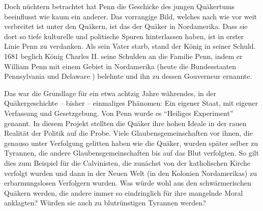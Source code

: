 \medskip

Doch nüchtern betrachtet hat Penn die Geschicke des jungen Quäkertums
beeinflusst wie kaum ein anderer. Das vorrangige Bild, welches nach wie vor weit
verbreitet ist unter den Quäkern, ist das der Quäker in Nordamerika. Dass sie
dort so tiefe kulturelle und politische Spuren hinterlassen haben, ist in erster
Linie Penn zu verdanken. Als sein Vater starb, stand der König in seiner Schuld.
1681 beglich König Charles II.  seine
Schulden  an die Familie Penn, indem er William Penn mit einem
Gebiet in Nordamerika (heute die Bundesstaaten Pennsylvania
 und Delaware ) belehnte und ihn
zu dessen Gouverneur ernannte.

\medskip

Das war die Grundlage für ein etwa achtzig Jahre währendes, in der Quäkergeschichte
-- bisher -- einmaliges Phänomen: Ein eigener Staat, mit eigener Verfassung und
Gesetzgebung. Von Penn wurde es "`Heiliges Experiment"' genannt. In diesem Projekt
stellten die Quäker ihre hohen Ideale in der rauen Realität der Politik auf die
Probe. Viele Glaubensgemeinschaften vor ihnen, die genauso unter Verfolgung
gelitten haben wie die Quäker, wurden später selber zu Tyrannen, die andere
Glaubensgemeinschaften bis auf das Blut verfolgten. So gilt dies zum Beispiel für die
Calvinisten, die zunächst von der katholischen
Kirche verfolgt wurden und dann in der Neuen Welt (in den Kolonien
Nordamerikas) zu erbarmungslosen Verfolgern wurden. Was würde wohl aus den
schwärmerischen Quäkern werden, die andere immer so eindringlich für ihre
mangelnde Moral anklagten? Würden sie auch zu blutrünstigen Tyrannen werden?

\medskip

